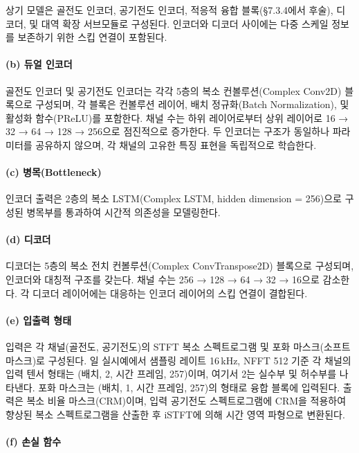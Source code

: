 \documentclass{article}
\begin{document}
상기 모델은 골전도 인코더, 공기전도 인코더, 적응적 융합 블록(§7.3.4에서 후술), 디코더, 및 대역 확장 서브모듈로 구성된다. 인코더와 디코더 사이에는 다중 스케일 정보를 보존하기 위한 스킵 연결이 포함된다.

\paragraph{(b) 듀얼 인코더}

골전도 인코더 및 공기전도 인코더는 각각 5층의 복소 컨볼루션(Complex Conv2D) 블록으로 구성되며, 각 블록은 컨볼루션 레이어, 배치 정규화(Batch Normalization), 및 활성화 함수(PReLU)를 포함한다. 채널 수는 하위 레이어로부터 상위 레이어로 16 → 32 → 64 → 128 → 256으로 점진적으로 증가한다. 두 인코더는 구조가 동일하나 파라미터를 공유하지 않으며, 각 채널의 고유한 특징 표현을 독립적으로 학습한다.

\paragraph{(c) 병목(Bottleneck)}

인코더 출력은 2층의 복소 LSTM(Complex LSTM, hidden dimension = 256)으로 구성된 병목부를 통과하여 시간적 의존성을 모델링한다.

\paragraph{(d) 디코더}

디코더는 5층의 복소 전치 컨볼루션(Complex ConvTranspose2D) 블록으로 구성되며, 인코더와 대칭적 구조를 갖는다. 채널 수는 256 → 128 → 64 → 32 → 16으로 감소한다. 각 디코더 레이어에는 대응하는 인코더 레이어의 스킵 연결이 결합된다.

\paragraph{(e) 입출력 형태}

입력은 각 채널(골전도, 공기전도)의 STFT 복소 스펙트로그램 및 포화 마스크(소프트 마스크)로 구성된다. 일 실시예에서 샘플링 레이트 16\,kHz, NFFT 512 기준 각 채널의 입력 텐서 형태는 (배치, 2, 시간 프레임, 257)이며, 여기서 2는 실수부 및 허수부를 나타낸다. 포화 마스크는 (배치, 1, 시간 프레임, 257)의 형태로 융합 블록에 입력된다. 출력은 복소 비율 마스크(CRM)이며, 입력 공기전도 스펙트로그램에 CRM을 적용하여 향상된 복소 스펙트로그램을 산출한 후 iSTFT에 의해 시간 영역 파형으로 변환된다.

\paragraph{(f) 손실 함수}
\end{document}
